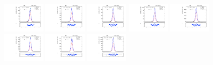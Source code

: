 \begin{figure}[htb]
\centering
\includegraphics[width=0.19\textwidth]{plots/Appendix_Recoil_Fits/ZmmMC_PF_13TeV_2G/pfu1fit_0.pdf}
\includegraphics[width=0.19\textwidth]{plots/Appendix_Recoil_Fits/ZmmMC_PF_13TeV_2G/pfu1fit_1.pdf}
\includegraphics[width=0.19\textwidth]{plots/Appendix_Recoil_Fits/ZmmMC_PF_13TeV_2G/pfu1fit_2.pdf}
\includegraphics[width=0.19\textwidth]{plots/Appendix_Recoil_Fits/ZmmMC_PF_13TeV_2G/pfu1fit_3.pdf}
\includegraphics[width=0.19\textwidth]{plots/Appendix_Recoil_Fits/ZmmMC_PF_13TeV_2G/pfu1fit_4.pdf}
\includegraphics[width=0.19\textwidth]{plots/Appendix_Recoil_Fits/ZmmMC_PF_13TeV_2G/pfu1fit_5.pdf}
\includegraphics[width=0.19\textwidth]{plots/Appendix_Recoil_Fits/ZmmMC_PF_13TeV_2G/pfu1fit_6.pdf}
\includegraphics[width=0.19\textwidth]{plots/Appendix_Recoil_Fits/ZmmMC_PF_13TeV_2G/pfu1fit_7.pdf}

\end{figure}
